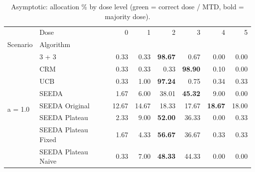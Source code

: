 \begin{table}[H]
\centering
\caption{Asymptotic: allocation \% by dose level (green = correct dose / MTD, bold = majority dose).}
\label{tab:asym_alloc_by_dose}
\begin{tabular}{llrrrrrr}
\toprule
 & Dose & 0 & 1 & 2 & 3 & 4 & 5 \\
Scenario & Algorithm &  &  &  &  &  &  \\
\midrule
\multirow[c]{8}{*}{a = 1.0} & 3 + 3 & 0.33 & 0.33 & {\cellcolor[HTML]{C8E6C9}} \bfseries 98.67 & 0.67 & 0.00 & 0.00 \\
 & CRM & 0.33 & 0.33 & {\cellcolor[HTML]{C8E6C9}} 0.33 & \bfseries 98.90 & 0.10 & 0.00 \\
 & UCB & 0.33 & 1.00 & {\cellcolor[HTML]{C8E6C9}} \bfseries 97.24 & 0.75 & 0.34 & 0.33 \\
 & SEEDA & 1.67 & 6.00 & {\cellcolor[HTML]{C8E6C9}} 38.01 & \bfseries 45.32 & 9.00 & 0.00 \\
 & SEEDA Original & 12.67 & 14.67 & {\cellcolor[HTML]{C8E6C9}} 18.33 & 17.67 & \bfseries 18.67 & 18.00 \\
 & SEEDA Plateau & 2.33 & 9.00 & {\cellcolor[HTML]{C8E6C9}} \bfseries 52.00 & 36.33 & 0.00 & 0.33 \\
 & SEEDA Plateau Fixed & 1.67 & 4.33 & {\cellcolor[HTML]{C8E6C9}} \bfseries 56.67 & 36.67 & 0.33 & 0.33 \\
 & SEEDA Plateau Naive & 0.33 & 7.00 & {\cellcolor[HTML]{C8E6C9}} \bfseries 48.33 & 44.33 & 0.00 & 0.00 \\
\bottomrule
\end{tabular}
\end{table}
